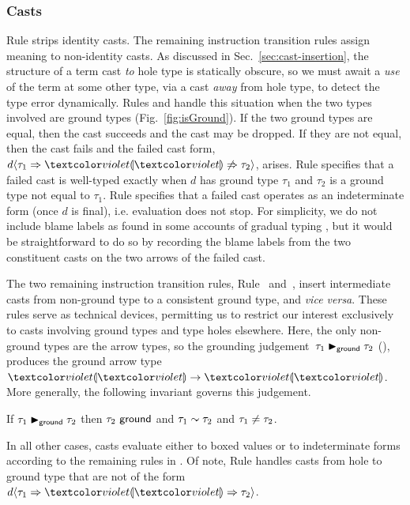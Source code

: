 \subsubsection{Casts}
Rule  strips identity casts. The remaining instruction
transition rules assign meaning to non-identity casts.
%
As discussed in Sec.~\ref{sec:cast-insertion}, the structure of a term
cast \emph{to} hole type is statically obscure,
%
so we must await a \emph{use} of the term at some other type, via a
cast \emph{away} from hole type, to detect the type error dynamically.
%
Rules  and  handle this situation when the
two types involved are ground types (Fig.~\ref{fig:isGround}).
%
If the two ground types are equal, then the cast succeeds and the cast
may be dropped.
%
If they are not equal, then the cast fails and the failed cast form,
$\dcastfail{\dexp}{\htau_1}{\htau_2}$, arises.
%
Rule  specifies that a failed cast is well-typed exactly
when $d$ has ground type $\tau_1$ and $\tau_2$ is a ground type
not equal to $\tau_1$.
%
Rule  specifies that a failed cast operates as an
indeterminate form (once $d$ is final), i.e. evaluation does not stop. For simplicity, we do not include blame labels as found in some accounts of gradual typing \cite{DBLP:conf/esop/WadlerF09,DBLP:conf/snapl/SiekVCB15}, but it would be straightforward to do so by recording the blame labels from the two constituent casts on the two arrows of the failed cast.

%
The two remaining instruction transition rules, Rule~
and~, insert intermediate casts from non-ground type to a
consistent ground type, and \emph{vice versa}.
%
These rules serve as technical devices, permitting us to restrict our
interest exclusively to casts involving ground types and type holes elsewhere.
%
Here, the only non-ground types are the arrow types, so the grounding
judgement~$\tau_1 \blacktriangleright_{\mathsf{ground}} \tau_2$ (),
produces the ground arrow type~$\tarr{\tehole}{\tehole}$.
%
More generally, the following invariant governs this judgement.
\begin{lem}[Grounding]
  If $\tau_1 \blacktriangleright_{\mathsf{ground}} \tau_2$
  then $\tau_2~\mathsf{ground}$
  and $\tau_1 \sim \tau_2$
  and $\tau_1\neq\tau_2$.
\end{lem}

In all other cases, casts evaluate either to boxed values or to
indeterminate forms according to the remaining rules
in .
%
Of note, Rule  handles casts from hole to
ground type that are not of
the form $\dcastthree{\dexp}{\htau_1}{\tehole}{\htau_2}$.
%

